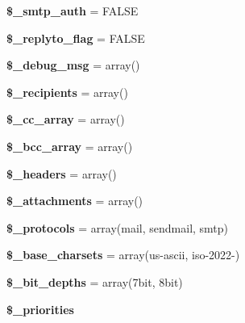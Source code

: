 \begin{DoxyCompactItemize}
\item 
\mbox{\label{class_c_i___email_a9b977d5970ceedb6cba44032a9976459}} 
{\bfseries \$\+\_\+smtp\+\_\+auth} = F\+A\+L\+SE
\item 
\mbox{\label{class_c_i___email_a00e8e2c2c72e6acf2cd91a8c4498695a}} 
{\bfseries \$\+\_\+replyto\+\_\+flag} = F\+A\+L\+SE
\item 
\mbox{\label{class_c_i___email_a23c65b604c773811f76e75093fe9a77b}} 
{\bfseries \$\+\_\+debug\+\_\+msg} = array()
\item 
\mbox{\label{class_c_i___email_aa5f5e78dd9477bdec18b4aadae77ba13}} 
{\bfseries \$\+\_\+recipients} = array()
\item 
\mbox{\label{class_c_i___email_af979b4b8dc11cd847482938c13fd527d}} 
{\bfseries \$\+\_\+cc\+\_\+array} = array()
\item 
\mbox{\label{class_c_i___email_a9e55a2ff848d216fa27361d3c66d979d}} 
{\bfseries \$\+\_\+bcc\+\_\+array} = array()
\item 
\mbox{\label{class_c_i___email_a1481ae63a7fb295087c3a668a0359500}} 
{\bfseries \$\+\_\+headers} = array()
\item 
\mbox{\label{class_c_i___email_a36f182452832f13cf40ab24ee9ffce90}} 
{\bfseries \$\+\_\+attachments} = array()
\item 
\mbox{\label{class_c_i___email_a67dcd847790518bf5fbe6576a0c11c04}} 
{\bfseries \$\+\_\+protocols} = array(\textquotesingle{}mail\textquotesingle{}, \textquotesingle{}sendmail\textquotesingle{}, \textquotesingle{}smtp\textquotesingle{})
\item 
\mbox{\label{class_c_i___email_a212a02e70f089ba2e1a29bd6f45b0691}} 
{\bfseries \$\+\_\+base\+\_\+charsets} = array(\textquotesingle{}us-\/ascii\textquotesingle{}, \textquotesingle{}iso-\/2022-\/\textquotesingle{})
\item 
\mbox{\label{class_c_i___email_a65b779b2385490a293d286a135bdf00c}} 
{\bfseries \$\+\_\+bit\+\_\+depths} = array(\textquotesingle{}7bit\textquotesingle{}, \textquotesingle{}8bit\textquotesingle{})
\item 
{\bfseries \$\+\_\+priorities}
\end{DoxyCompactItemize}
